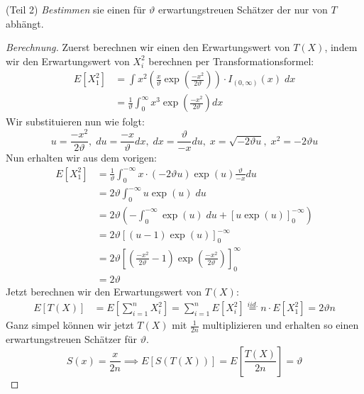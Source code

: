\documentclass[a4paper]{article}
\begin{document}
\begin{theorem}
(Teil 2) \textit{Bestimmen} sie einen für $\vartheta$ erwartungstreuen Schätzer der nur von
$T$ abhängt.

\begin{proof}[Berechnung]
	Zuerst berechnen wir einen den Erwartungswert von $T(X)$, indem wir den Erwartungswert von
	$X_i ^2$ berechnen per Transformationsformel:
	\begin{align*}
		E \left[
			X_1 ^2
		\right] &= \int x ^2 \left(
			\frac{ x }{ \vartheta } \exp \left(
				\frac{ -x ^2 }{ 2 \vartheta }
			\right) 
		\right) \cdot I_{ ( 0, \infty ) } (x) \; dx \\
			&= \frac{ 1 }{ \vartheta } \int_{0}^{\infty} x ^3 \exp \left(
				\frac{ -x ^2 }{ 2 \vartheta }
			\right) dx
	\end{align*}
	Wir substituieren nun wie folgt:
	\[
	u = \frac{ -x ^2 }{ 2 \vartheta },\; du = \frac{ -x }{ \vartheta } dx,\;
	dx = \frac{ \vartheta }{ -x } du,\; x = \sqrt{- 2 \vartheta u},\;
	x ^2 = - 2\vartheta u
	\] 
	Nun erhalten wir aus dem vorigen:
	\begin{align*}
		E \left[
			X_1 ^2
		\right] &= \frac{ 1 }{ \vartheta }
		\int_{0}^{- \infty} x \cdot (- 2 \vartheta u) \exp (u) \frac{ \vartheta }{ -x } du \\
				&= 2 \vartheta \int_{0}^{- \infty} u \exp(u) \; du \\
				&= 2 \vartheta \left(
					- \int_{0}^{- \infty} \exp(u) \; du + \left[
						u \exp(u)
					\right]_0^{- \infty}
				\right) \\
				&= 2 \vartheta \left[
					(u - 1) \exp(u)
				\right]_0^{- \infty} \\
				&= 2 \vartheta \left[
					\left(
						\frac{ - x ^2 }{ 2 \vartheta } - 1
					\right) 
					 \exp \left(
						\frac{ -x ^2 }{ 2 \vartheta }
					\right) 
				\right]_0^{\infty} \\
				&= 2 \vartheta
	\end{align*}
	Jetzt berechnen wir den Erwartungswert von $T(X)$:
	\begin{align*}
		E \left[
			T(X)
		\right] &= E \left[
			\sum_{i=1}^{n} X_i ^2
		\right] 
		= \sum_{i=1}^{n} E \left[
			X_i ^2
		\right] \overset{iid.} = n \cdot E \left[
			X_1 ^2
		\right] = 2 \vartheta n
	\end{align*}
	Ganz simpel können wir jetzt $T(X)$ mit $\frac{ 1 }{ 2 n }$ multiplizieren und erhalten
	so einen erwartungstreuen Schätzer für $\vartheta$.
	\[
		S (x) = \frac{ x }{ 2 n } \implies E \left[
			S(T(X)) 
		\right] = E \left[
			\frac{ T(X) }{ 2 n }
		\right] = \vartheta
	\] 
\end{proof}
\end{theorem}
\end{document}
